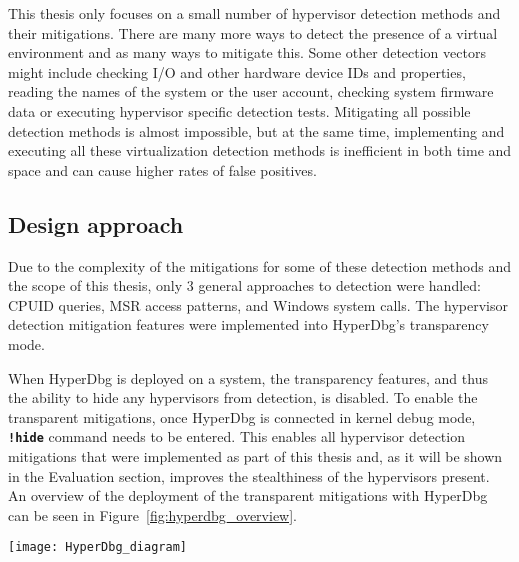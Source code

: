 This thesis only focuses on a small number of hypervisor detection methods and their mitigations. There are many more ways to detect the presence of a virtual environment and as many ways to mitigate this.
Some other detection vectors might include checking I/O and other hardware device IDs and properties, reading the names of the system or the user account, checking system firmware data or executing hypervisor specific detection tests.
Mitigating all possible detection methods is almost impossible, but at the same time, implementing and executing all these virtualization detection methods is inefficient in both time and space and can cause higher rates of false positives.


\subsection{Design approach}\label{design_approach}
Due to the complexity of the mitigations for some of these detection methods and the scope of this thesis, only 3 general approaches to detection were handled: CPUID queries, MSR access patterns, and Windows system calls. 
The hypervisor detection mitigation features were implemented into HyperDbg's transparency mode. 

When HyperDbg is deployed on a system, the transparency features, and thus the ability to hide any hypervisors from detection, is disabled. To enable the transparent mitigations, 
once HyperDbg is connected in kernel debug mode, \textbf{\texttt{!hide}} command needs to be entered. This enables all hypervisor detection mitigations that were implemented as part of this thesis and, 
as it will be shown in the Evaluation section, improves the stealthiness of the hypervisors present. An overview of the deployment of the transparent mitigations with HyperDbg can be seen in Figure~\ref{fig:hyperdbg_overview}.

\begin{figure*}[t]
    \texttt{[image: HyperDbg\_diagram]} %
    \label{fig:hyperdbg_overview}
\end{figure*}


